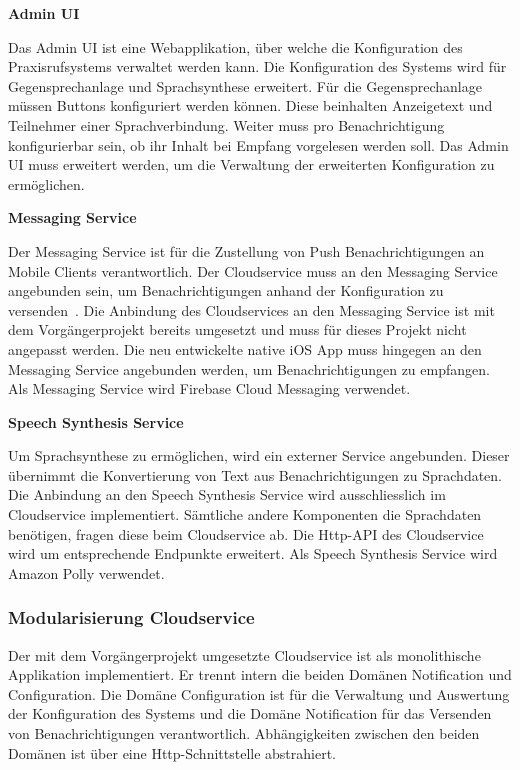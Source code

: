 \textbf{Admin UI}

Das Admin UI ist eine Webapplikation, über welche die Konfiguration des Praxisrufsystems verwaltet werden kann.
Die Konfiguration des Systems wird für Gegensprechanlage und Sprachsynthese erweitert.
Für die Gegensprechanlage müssen Buttons konfiguriert werden können.
Diese beinhalten Anzeigetext und Teilnehmer einer Sprachverbindung.
Weiter muss pro Benachrichtigung konfigurierbar sein, ob ihr Inhalt bei Empfang vorgelesen werden soll.
Das Admin UI muss erweitert werden, um die Verwaltung der erweiterten Konfiguration zu ermöglichen.

\textbf{Messaging Service}

Der Messaging Service ist für die Zustellung von Push Benachrichtigungen an Mobile Clients verantwortlich.
Der Cloudservice muss an den Messaging Service angebunden sein, um Benachrichtigungen anhand der Konfiguration zu versenden~\cite{ip5}.
Die Anbindung des Cloudservices an den Messaging Service ist mit dem Vorgängerprojekt bereits umgesetzt und muss für dieses Projekt nicht angepasst werden.
Die neu entwickelte native iOS App muss hingegen an den Messaging Service angebunden werden, um Benachrichtigungen zu empfangen.
Als Messaging Service wird Firebase Cloud Messaging verwendet.

\clearpage

\textbf{Speech Synthesis Service}

Um Sprachsynthese zu ermöglichen, wird ein externer Service angebunden.
Dieser übernimmt die Konvertierung von Text aus Benachrichtigungen zu Sprachdaten.
Die Anbindung an den Speech Synthesis Service wird ausschliesslich im Cloudservice implementiert.
Sämtliche andere Komponenten die Sprachdaten benötigen, fragen diese beim Cloudservice ab.
Die Http-API des Cloudservice wird um entsprechende Endpunkte erweitert.
Als Speech Synthesis Service wird Amazon Polly verwendet.

\subsubsection{Modularisierung Cloudservice}

Der mit dem Vorgängerprojekt umgesetzte Cloudservice ist als monolithische Applikation implementiert.
Er trennt intern die beiden Domänen Notification und Configuration.
Die Domäne Configuration ist für die Verwaltung und Auswertung der Konfiguration des Systems und die Domäne Notification für das Versenden von Benachrichtigungen verantwortlich.
Abhängigkeiten zwischen den beiden Domänen ist über eine Http-Schnittstelle abstrahiert.

